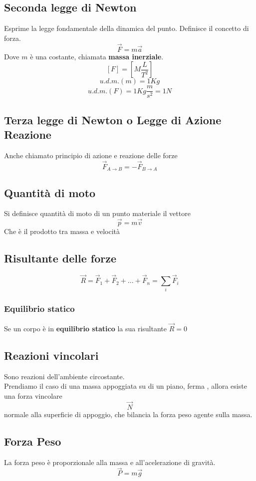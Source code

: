 \documentclass[a4paper]{report}
\begin{document}
  \subsection{Seconda legge di Newton}
  Esprime la legge fondamentale della dinamica del punto. Definisce il concetto di forza.
  $$ \vec{F} = m\vec{a} $$
  Dove $m$ è una costante, chiamata \textbf{massa inerziale}.
  $$ [F] = [M \frac{L}{T^2}]$$
  $$ u.d.m.(m) = 1Kg$$
  $$ u.d.m.(F) = 1 Kg \frac{m}{s^2} = 1N$$

  \subsection{Terza legge di Newton o Legge di Azione Reazione}
  Anche chiamato principio di azione e reazione delle forze
  $$ \vec{F}_{A \rightarrow B} = -\vec{F}_{B \rightarrow A} $$

  \subsection{Quantità di moto}
  Si definisce quantità di moto di un punto materiale il vettore
  $$ \vec{p} = m\vec{v} $$
  Che è il prodotto tra massa e velocità

  \subsection{Risultante delle forze}
  $$ \vec{R} = \vec{F}_1 + \vec{F}_2 + ... +\vec{F}_n = \sum_i \vec{F}_i $$

  \subsubsection{Equilibrio statico}
  Se un corpo è in \textbf{equilibrio statico} la sua risultante $\vec{R} = 0$

  \subsection{Reazioni vincolari}
  Sono reazioni dell'ambiente circostante.\\
  Prendiamo il caso di una massa appoggiata su di un piano, ferma , allora esiste una forza vincolare
  $$ \vec{N} $$
  normale alla superficie di appoggio, che bilancia la forza peso agente sulla massa.

  \subsection{Forza Peso}
  La forza peso è proporzionale alla massa e all'acelerazione di gravità.
  $$ \vec{P} = m\vec{g} $$
\end{document}
